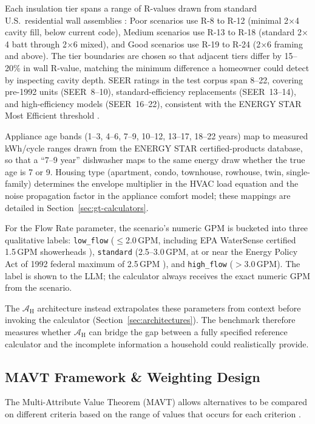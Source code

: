 \documentclass[final,3p,times]{elsarticle}
\begin{document}
Each insulation tier spans a range of R-values drawn from standard U.S.\ residential wall assemblies \cite{cec_ja43_2013,energystar_insulation2023}: Poor scenarios use R-8 to R-12 (minimal 2$\times$4 cavity fill, below current code), Medium scenarios use R-13 to R-18 (standard 2$\times$4 batt through 2$\times$6 mixed), and Good scenarios use R-19 to R-24 (2$\times$6 framing and above). The tier boundaries are chosen so that adjacent tiers differ by 15--20\% in wall R-value, matching the minimum difference a homeowner could detect by inspecting cavity depth. SEER ratings in the test corpus span 8--22, covering pre-1992 units (SEER~8--10), standard-efficiency replacements (SEER~13--14), and high-efficiency models (SEER~16--22), consistent with the ENERGY STAR Most Efficient threshold \cite{energystar_ac2023}.

Appliance age bands (1--3, 4--6, 7--9, 10--12, 13--17, 18--22 years) map to measured kWh/cycle ranges drawn from the ENERGY STAR certified-products database, so that a ``7--9 year'' dishwasher maps to the same energy draw whether the true age is 7 or 9. Housing type (apartment, condo, townhouse, rowhouse, twin, single-family) determines the envelope multiplier in the HVAC load equation and the noise propagation factor in the appliance comfort model; these mappings are detailed in Section~\ref{sec:gt-calculators}.

For the Flow Rate parameter, the scenario's numeric GPM is bucketed into three qualitative labels: \texttt{low\_flow} ($\le$2.0\,GPM, including EPA WaterSense certified 1.5\,GPM showerheads \cite{epawatersense}), \texttt{standard} (2.5--3.0\,GPM, at or near the Energy Policy Act of 1992 federal maximum of 2.5\,GPM \cite{epawatersense}), and \texttt{high\_flow} ($>$3.0\,GPM). The label is shown to the LLM; the calculator always receives the exact numeric GPM from the scenario.

The $\mathcal{A}_{\text{H}}$ architecture instead extrapolates these parameters from context before invoking the calculator (Section~\ref{sec:architectures}). The benchmark therefore measures whether $\mathcal{A}_{\text{H}}$ can bridge the gap between a fully specified reference calculator and the incomplete information a household could realistically provide.

\subsection{MAVT Framework \& Weighting Design}
\label{sec:mavt-design}
The Multi-Attribute Value Theorem (MAVT) allows alternatives to be compared on different criteria based on the range of values that occurs for each criterion \cite{keeneyraiffa1976,dyer1979}.
\end{document}
